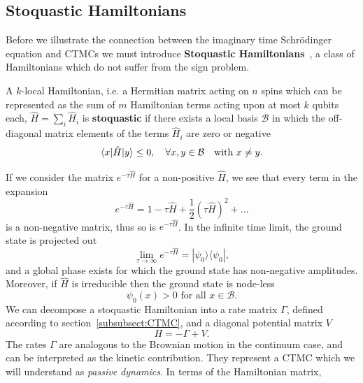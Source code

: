 \subsection{Stoquastic Hamiltonians}
\label{subsec:fk-latt}
Before we illustrate the connection between the imaginary time Schr\" odinger equation and CTMCs we must introduce \textbf{Stoquastic Hamiltonians}~\cite{bravyi2006complexity}, a class of Hamiltonians which do not suffer from the sign problem.
\begin{definition}
	A $k$-local Hamiltonian, i.e. a Hermitian matrix acting on $n$ spins which can be represented as the sum of $m$ Hamiltonian terms acting upon at most $k$ qubits each, $\hat H=\sum_{i} \hat H_{i}$ is \textbf{stoquastic} if there exists a local basis $\mathcal{B}$ in which the off-diagonal matrix elements of the terms $\hat{H}_i$ are zero or negative
	\begin{equation}
		\langle x|\hat H| y\rangle \leq 0, \quad \forall x, y \in \mathcal{B} \text {\quad with } x \neq y.
	\end{equation}
\end{definition}
\noindent
If we consider the matrix $e^{-\tau \hat H}$ for a non-positive $\hat H$, we see that every term in the expansion
\begin{equation}
	e^{-\tau \hat{H}} = 1 -\tau \hat{H} + \frac{1}{2}(\tau \hat{H})^2 + \ldots
\end{equation}
is a non-negative matrix, thus so is $e^{-\tau \hat H}$. In the infinite time limit, the ground state is projected out
\begin{equation}
	\lim _{\tau \rightarrow \infty} e^{-\tau \hat H}=|\psi_0\rangle\langle\psi_0|, 
\end{equation}
and a global phase exists for which the ground state has non-negative amplitudes. Moreover, if $\hat H$ is irreducible then the ground state is node-less~\cite{discussion_stoquastic2017}
\begin{equation}
	\psi_0(x)>0 \text { for all } x \in \mathcal{B}.
\end{equation}
We can decompose a stoquastic Hamiltonian into a rate matrix $\Gamma$, defined according to section~\ref{subsubsect:CTMC}, and a diagonal potential matrix $V$
\begin{equation}
	\label{eq:hamilton_split}
	H = -\Gamma + V.
\end{equation}
The rates $\Gamma$ are analogous to the Brownian motion in the continuum case, and can be interpreted as the kinetic contribution. They represent a CTMC which we will understand as \emph{passive dynamics}. In terms of the Hamiltonian matrix,
